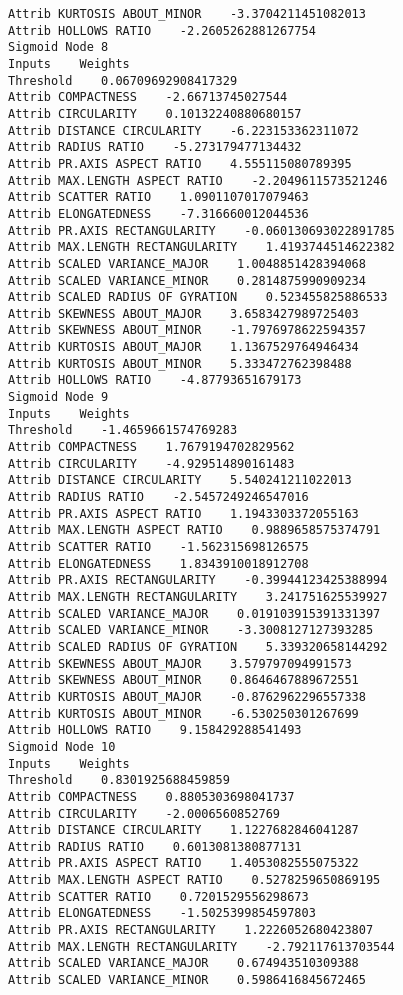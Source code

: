 \documentclass[
	article,			%
	11pt,				%
	oneside,			%
	a4paper,			%
	english,			%
	brazil,				%
	sumario=tradicional
	]{abntex2}
\begin{document}
\begin{lstlisting}
Attrib KURTOSIS ABOUT_MINOR    -3.3704211451082013
Attrib HOLLOWS RATIO    -2.2605262881267754
Sigmoid Node 8
Inputs    Weights
Threshold    0.06709692908417329
Attrib COMPACTNESS    -2.66713745027544
Attrib CIRCULARITY    0.10132240880680157
Attrib DISTANCE CIRCULARITY    -6.223153362311072
Attrib RADIUS RATIO    -5.273179477134432
Attrib PR.AXIS ASPECT RATIO    4.555115080789395
Attrib MAX.LENGTH ASPECT RATIO    -2.2049611573521246
Attrib SCATTER RATIO    1.0901107017079463
Attrib ELONGATEDNESS    -7.316660012044536
Attrib PR.AXIS RECTANGULARITY    -0.060130693022891785
Attrib MAX.LENGTH RECTANGULARITY    1.4193744514622382
Attrib SCALED VARIANCE_MAJOR    1.0048851428394068
Attrib SCALED VARIANCE_MINOR    0.2814875990909234
Attrib SCALED RADIUS OF GYRATION    0.523455825886533
Attrib SKEWNESS ABOUT_MAJOR    3.6583427989725403
Attrib SKEWNESS ABOUT_MINOR    -1.7976978622594357
Attrib KURTOSIS ABOUT_MAJOR    1.1367529764946434
Attrib KURTOSIS ABOUT_MINOR    5.333472762398488
Attrib HOLLOWS RATIO    -4.87793651679173
Sigmoid Node 9
Inputs    Weights
Threshold    -1.4659661574769283
Attrib COMPACTNESS    1.7679194702829562
Attrib CIRCULARITY    -4.929514890161483
Attrib DISTANCE CIRCULARITY    5.540241211022013
Attrib RADIUS RATIO    -2.5457249246547016
Attrib PR.AXIS ASPECT RATIO    1.1943303372055163
Attrib MAX.LENGTH ASPECT RATIO    0.9889658575374791
Attrib SCATTER RATIO    -1.562315698126575
Attrib ELONGATEDNESS    1.8343910018912708
Attrib PR.AXIS RECTANGULARITY    -0.39944123425388994
Attrib MAX.LENGTH RECTANGULARITY    3.241751625539927
Attrib SCALED VARIANCE_MAJOR    0.019103915391331397
Attrib SCALED VARIANCE_MINOR    -3.3008127127393285
Attrib SCALED RADIUS OF GYRATION    5.339320658144292
Attrib SKEWNESS ABOUT_MAJOR    3.579797094991573
Attrib SKEWNESS ABOUT_MINOR    0.8646467889672551
Attrib KURTOSIS ABOUT_MAJOR    -0.8762962296557338
Attrib KURTOSIS ABOUT_MINOR    -6.530250301267699
Attrib HOLLOWS RATIO    9.158429288541493
Sigmoid Node 10
Inputs    Weights
Threshold    0.8301925688459859
Attrib COMPACTNESS    0.8805303698041737
Attrib CIRCULARITY    -2.0006560852769
Attrib DISTANCE CIRCULARITY    1.1227682846041287
Attrib RADIUS RATIO    0.6013081380877131
Attrib PR.AXIS ASPECT RATIO    1.4053082555075322
Attrib MAX.LENGTH ASPECT RATIO    0.5278259650869195
Attrib SCATTER RATIO    0.7201529556298673
Attrib ELONGATEDNESS    -1.5025399854597803
Attrib PR.AXIS RECTANGULARITY    1.2226052680423807
Attrib MAX.LENGTH RECTANGULARITY    -2.792117613703544
Attrib SCALED VARIANCE_MAJOR    0.674943510309388
Attrib SCALED VARIANCE_MINOR    0.5986416845672465

\end{lstlisting}
\end{document}
